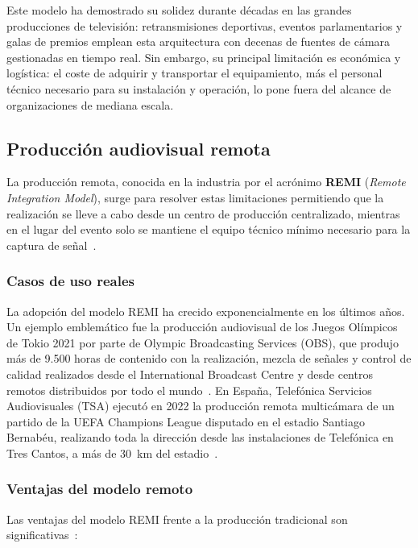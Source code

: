 Este modelo ha demostrado su solidez durante décadas en las grandes producciones de
televisión: retransmisiones deportivas, eventos parlamentarios y galas de premios
emplean esta arquitectura con decenas de fuentes de cámara gestionadas en tiempo real.
Sin embargo, su principal limitación es económica y logística: el coste de adquirir y
transportar el equipamiento, más el personal técnico necesario para su instalación y
operación, lo pone fuera del alcance de organizaciones de mediana escala.

\subsection{Producción audiovisual remota}

La producción remota, conocida en la industria por el acrónimo
\textbf{REMI} (\textit{Remote Integration Model}), surge para resolver estas
limitaciones permitiendo que la realización se lleve a cabo desde un centro de
producción centralizado, mientras en el lugar del evento solo se mantiene el equipo
técnico mínimo necesario para la captura de señal~\cite{tmbroadcast_remi}.

\subsubsection*{Casos de uso reales}

La adopción del modelo REMI ha crecido exponencialmente en los últimos años. Un ejemplo
emblemático fue la producción audiovisual de los Juegos Olímpicos de Tokio 2021 por
parte de Olympic Broadcasting Services (OBS), que produjo más de 9.500 horas de
contenido con la realización, mezcla de señales y control de calidad realizados desde
el International Broadcast Centre y desde centros remotos distribuidos por todo el
mundo~\cite{obs_tokyo_2021}. En España, Telefónica Servicios Audiovisuales (TSA)
ejecutó en 2022 la producción remota multicámara de un partido de la UEFA Champions
League disputado en el estadio Santiago Bernabéu, realizando toda la dirección desde
las instalaciones de Telefónica en Tres Cantos, a más de 30~km del estadio~\cite{tsa_remi_2022}.

\subsubsection*{Ventajas del modelo remoto}

Las ventajas del modelo REMI frente a la producción tradicional son significativas~\cite{tmbroadcast_remi}:

